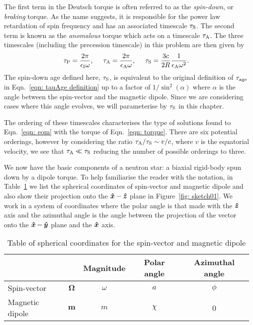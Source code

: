 \documentclass[../full_thesis/full_thesis.tex]{subfiles}
\begin{document}
The first term in the Deutsch torque is often referred to as the
\emph{spin-down}, or \emph{braking} torque. As the name suggests, it is
responsible for the power law retardation of spin frequency and has an
associated timescale $\tau_{\mathrm{S}}$. The second term is known as the
\emph{anomalous} torque which acts on a timescale $\tau_{\mathrm{A}}$. The three
timescales (including the precession timescale) in this problem are then given
by
\begin{equation}
\tau_{\mathrm{P}}=\frac{2\pi}{\epsilon_{\mathrm{I}}\omega},  \;\;\;\;\;
\tau_{\mathrm{A}}=\frac{2\pi}{\epsilon_{\mathrm{A}}\omega},  \;\;\;\;\;
\tau_{\mathrm{S}}=\frac{3c}{2R}\frac{1}{\epsilon_{\mathrm{A}}\omega^{2}}.
\label{eqn: torque timescales}
\end{equation}
The spin-down age defined here, $\tau_{\mathrm{S}}$, is equivalent to the original
definition of $\tau_{\mathrm{age}}$ in Eqn.~\eqref{eqn: tauAge definition} up to a factor
of $1/\sin^{2}(\alpha)$ where $\alpha$ is the angle between the spin-vector and
the magnetic dipole. Since we are considering cases where this angle evolves, we
will parameterise by $\tau_{\mathrm{S}}$ in this chapter.

The ordering of these timescales characterises the type of solutions found to
Eqn.~\eqref{eqn: eom} with the torque of Eqn.~\eqref{eqn: torque}. There are
six potential orderings, however by considering the ratio $\tau_{\mathrm{A}}/\tau_{\mathrm{S}}
\sim v/c$, where $v$ is the equatorial velocity, we see that $\tau_{\mathrm{A}} \ll
\tau_{\mathrm{S}}$ reducing the number of possible orderings to three.

We now have the basic components of a neutron star: a biaxial rigid-body spun
down by a dipole torque. To help familiarise the reader with the notation, in
Table~\ref{tab: definitions} we list the spherical coordinates of spin-vector
and magnetic dipole and also show their projection onto the $\boldsymbol{\hat{x}}-\boldsymbol{\hat{z}}$ plane in
Figure~\ref{fig: sketch01}. We work in a system of coordinates where the polar
angle is that made with the $\boldsymbol{\hat{z}}$ axis and the azimuthal angle is the angle between
the projection of the vector onto the $\boldsymbol{\hat{x}}-\boldsymbol{\hat{y}}$ plane and the $\boldsymbol{\hat{x}}$ axis.
\begin{table}[ht]
\centering
\begin{tabular}{|l|c|c|c|c|} \hline
 \multicolumn{2}{|c|}{} & Magnitude & Polar angle & Azimuthal angle \\ \hline
Spin-vector  & $\boldsymbol{\Omega}$ & $\omega$ & $a$ & $\phi$ \\ \hline
Magnetic dipole &  $\boldsymbol{m}$ & $m$ & $\chi$ & 0 \\ \hline
\end{tabular}
\caption{Table of spherical coordinates for the spin-vector and magnetic dipole}
\label{tab: definitions}
\end{table}
\end{document}
